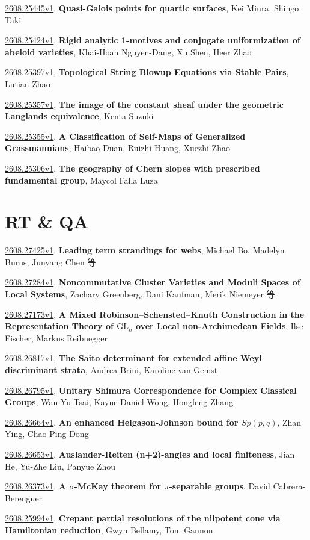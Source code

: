 \documentclass[9pt, a4paper]{article}
\theoremstyle{plain}
\theoremstyle{definition}
\theoremstyle{remark}
\newcommand{\arxiv}[3]{\href{https://arxiv.org/abs/#1}{#1}, \textbf{\textcolor{arxivblue}{#2}}, #3}
\begin{document}
\arxiv{2608.25445v1}{Quasi-Galois points for quartic surfaces}{Kei Miura, Shingo Taki}

\arxiv{2608.25424v1}{Rigid analytic 1-motives and conjugate uniformization of abeloid varieties}{Khai-Hoan Nguyen-Dang, Xu Shen, Heer Zhao}

\arxiv{2608.25397v1}{Topological String Blowup Equations via Stable Pairs}{Lutian Zhao}

\arxiv{2608.25357v1}{The image of the constant sheaf under the geometric Langlands equivalence}{Kenta Suzuki}

\arxiv{2608.25355v1}{A Classification of Self-Maps of Generalized Grassmannians}{Haibao Duan, Ruizhi Huang, Xuezhi Zhao}

\arxiv{2608.25306v1}{The geography of Chern slopes with prescribed fundamental group}{Maycol Falla Luza}


\section{RT \& QA}
\arxiv{2608.27425v1}{Leading term strandings for webs}{Michael Bo, Madelyn Burns, Junyang Chen 等}

\arxiv{2608.27284v1}{Noncommutative Cluster Varieties and Moduli Spaces of Local Systems}{Zachary Greenberg, Dani Kaufman, Merik Niemeyer 等}

\arxiv{2608.27173v1}{A Mixed Robinson--Schensted--Knuth Construction in the Representation Theory of $\mathrm{GL}_n$ over Local non-Archimedean Fields}{Ilse Fischer, Markus Reibnegger}

\arxiv{2608.26817v1}{The Saito determinant for extended affine Weyl discriminant strata}{Andrea Brini, Karoline van Gemst}

\arxiv{2608.26795v1}{Unitary Shimura Correspondence for Complex Classical Groups}{Wan-Yu Tsai, Kayue Daniel Wong, Hongfeng Zhang}

\arxiv{2608.26664v1}{An enhanced Helgason-Johnson bound for $Sp(p, q)$}{Zhan Ying, Chao-Ping Dong}

\arxiv{2608.26653v1}{Auslander-Reiten (n+2)-angles and local finiteness}{Jian He, Yu-Zhe Liu, Panyue Zhou}

\arxiv{2608.26373v1}{A $σ$-McKay theorem for $π$-separable groups}{David Cabrera-Berenguer}

\arxiv{2608.25994v1}{Crepant partial resolutions of the nilpotent cone via Hamiltonian reduction}{Gwyn Bellamy, Tom Gannon}
\end{document}
